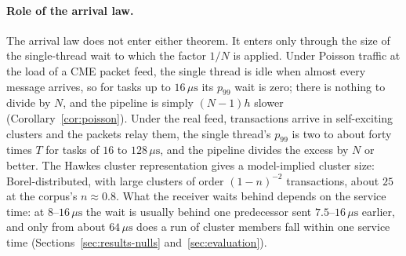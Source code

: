 \documentclass[11pt]{article}
\begin{document}
\paragraph{Role of the arrival law.} The arrival law does not enter either
theorem. It enters only through the size of the single-thread wait to which the factor
$1/N$ is applied. Under Poisson traffic at the load of a CME packet feed, the single thread is
idle when almost every message arrives, so for tasks up to $16\,\mu\mathrm{s}$ its
$p_{99}$ wait is zero; there is nothing to divide by $N$, and the pipeline is simply
$(N-1)h$ slower (Corollary~\ref{cor:poisson}). Under the real feed, transactions arrive
in self-exciting clusters and the packets relay them, the single thread's $p_{99}$ is two
to about forty times $T$ for tasks of $16$ to $128\,\mu\mathrm{s}$, and the pipeline divides
the excess by $N$ or better.
The Hawkes cluster representation gives a model-implied cluster size: Borel-distributed,
with large clusters of order $(1-n)^{-2}$ transactions, about $25$ at the corpus's
$n \approx 0.8$. What the receiver waits behind depends on the service time: at
$8$--$16\,\mu\mathrm{s}$ the wait is usually behind one predecessor sent
$7.5$--$16\,\mu\mathrm{s}$ earlier,
and only from about $64\,\mu\mathrm{s}$ does a run of cluster members fall within one
service time (Sections~\ref{sec:results-nulls} and~\ref{sec:evaluation}).
\end{document}
